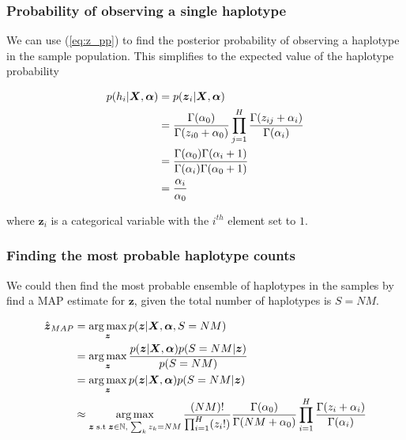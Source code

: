 \documentclass{article}
\DeclareMathOperator*{\argmax}{arg\,max}
\begin{document}
\subsubsection{Probability of observing a single haplotype}

We can use (\ref{eq:z_pp}) to find the posterior probability of observing a haplotype in the sample population. This simplifies to the expected value of the haplotype probability

\begin{align}
     p(h_i | \boldsymbol{X}, \boldsymbol{\alpha}) &= p(\boldsymbol{z}_i | \boldsymbol{X}, \boldsymbol{\alpha}) \notag \\
    &= \frac{\Gamma(\alpha_0)}{\Gamma(z_{i0} + \alpha_0)} \prod_{j = 1}^H \frac{\Gamma(z_{ij} + \alpha_i)}{\Gamma(\alpha_i)} \notag \\
    &= \frac{\Gamma(\alpha_0)\Gamma(\alpha_i + 1)}{\Gamma(\alpha_i)\Gamma(\alpha_0 + 1)} \notag \\
    &= \frac{\alpha_i}{\alpha_0}
\end{align}

where $\boldsymbol{z}_i$ is a categorical variable with the $i^{th}$ element set to $1$.

\subsubsection{Finding the most probable haplotype counts}

We could then find the most probable ensemble of haplotypes in the samples by find a MAP estimate for $\boldsymbol{z}$, given the total number of haplotypes is $S = NM$.

\begin{align}
    \hat{\boldsymbol{z}}_{MAP} &= \argmax_{\boldsymbol{z}} p(\boldsymbol{z} | \boldsymbol{X}, \boldsymbol{\alpha}, S = NM)\notag\\
    &= \argmax_{\boldsymbol{z}} \frac{p(\boldsymbol{z} | \boldsymbol{X}, \boldsymbol{\alpha})p(S = NM | \boldsymbol{z})}{p(S = NM)}\notag\\
    &= \argmax_{\boldsymbol{z}} p(\boldsymbol{z} | \boldsymbol{X}, \boldsymbol{\alpha})p(S = NM | \boldsymbol{z})\notag\\
    &\approx \argmax_{\boldsymbol{z} \; \text{s.t} \; \boldsymbol{z} \in \mathbb{N},\; \sum_k z_k = NM} \frac{(NM)!}{\prod_{i = 1}^{H} (z_i!)} \frac{\Gamma(\alpha_0)}{\Gamma(NM + \alpha_0)} \prod_{i = 1}^H \frac{\Gamma(z_i + \alpha_i)}{\Gamma(\alpha_i)}
\end{align}
\end{document}
